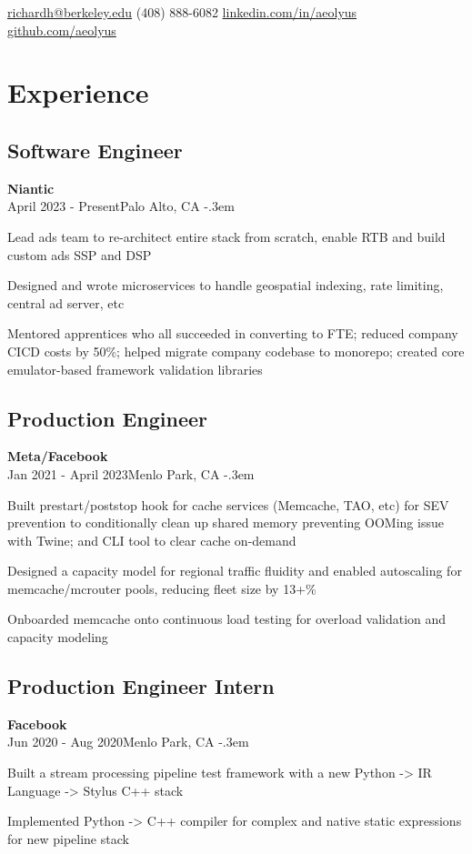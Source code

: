 \documentclass{article}
\makeatletter
\def\faEmail{{\FAFR \symbol{"F0E0}}} %
\def\faPhone{{\FAFR \symbol{"F095}}} %
\def\faLinkedin{{\FAB \symbol{"F08C}}} %
\def\faGithub{{\FAB \symbol{"F09B}}} %
\let\olditemize=\itemize \let\endolditemize=\enditemize
\renewenvironment{itemize}{\olditemize[topsep=0em] \itemsep-.3em}{\endolditemize}
\newcommand{\link}[1]{\href{https://#1}{#1}}
\newcommand{\entry}[3]{\quad\textbf{#1}\\#2\qquad#3}
\renewcommand{\maketitle}{
  \begin{flushleft}
    \Huge\bfseries\theauthor
  \end{flushleft}
  \begin{bfseries}
    \faEmail    \hspace{1pt} \href{mailto:richardh@berkeley.edu}{richardh@berkeley.edu} \quad
    \faPhone    \hspace{1pt} (408) 888-6082 \quad
    \faLinkedin \hspace{1pt} \link{linkedin.com/in/aeolyus} \quad
    \faGithub   \hspace{1pt} \link{github.com/aeolyus}
  \end{bfseries}
}
\makeatother
\begin{document}
\author{\color{accentcolor}Richard Huang}
\maketitle


\section{Experience}

\subsection{Software Engineer}
\entry{Niantic}{April 2023 - Present}{Palo Alto, CA}
\begin{itemize}
  \item Lead ads team to re-architect entire stack from scratch, enable RTB and
    build custom ads SSP and DSP
  \item Designed and wrote microservices to handle geospatial indexing, rate
    limiting, central ad server, etc
  \item Mentored apprentices who all succeeded in converting to FTE; reduced
    company CICD costs by 50\%; helped migrate company codebase to monorepo;
    created core emulator-based framework validation libraries
\end{itemize}

\subsection{Production Engineer}
\entry{Meta/Facebook}{Jan 2021 - April 2023}{Menlo Park, CA}
\begin{itemize}
  \item Built prestart/poststop hook for cache services (Memcache, TAO, etc)
    for SEV prevention to conditionally clean up shared memory preventing
    OOMing issue with Twine; and CLI tool to clear cache on-demand
  \item Designed a capacity model for regional traffic fluidity and enabled
    autoscaling for memcache/mcrouter pools, reducing fleet size by 13+\%
  \item Onboarded memcache onto continuous load testing for overload validation
    and capacity modeling
\end{itemize}

\subsection{Production Engineer Intern}
\entry{Facebook}{Jun 2020 - Aug 2020}{Menlo Park, CA}
\begin{itemize}
  \item Built a stream processing pipeline test framework with a new Python -> IR Language -> Stylus C++ stack
  \item Implemented Python -> C++ compiler for complex and native static expressions for new pipeline stack
\end{itemize}
\end{document}
